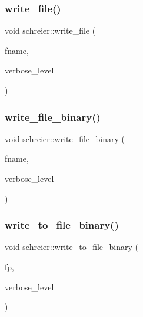 \mbox{\label{classschreier_a4b094c9217263aae3d58dc090f9e7867}} 
\subsubsection{\texorpdfstring{write\+\_\+file()}{write\_file()}}
{\footnotesize\ttfamily void schreier\+::write\+\_\+file (\begin{DoxyParamCaption}\item[{\mbox{\hyperlink{galois_8h_ab6cc7b4aeb6ea31aba2b3fbfc83ff5e6}{B\+Y\+TE}} $\ast$}]{fname,  }\item[{\mbox{\hyperlink{galois_8h_a09fddde158a3a20bd2dcadb609de11dc}{I\+NT}}}]{verbose\+\_\+level }\end{DoxyParamCaption})}

\mbox{\label{classschreier_ab72cab9ab2322675d1a1ad601b556332}} 
\subsubsection{\texorpdfstring{write\+\_\+file\+\_\+binary()}{write\_file\_binary()}}
{\footnotesize\ttfamily void schreier\+::write\+\_\+file\+\_\+binary (\begin{DoxyParamCaption}\item[{\mbox{\hyperlink{galois_8h_ab6cc7b4aeb6ea31aba2b3fbfc83ff5e6}{B\+Y\+TE}} $\ast$}]{fname,  }\item[{\mbox{\hyperlink{galois_8h_a09fddde158a3a20bd2dcadb609de11dc}{I\+NT}}}]{verbose\+\_\+level }\end{DoxyParamCaption})}

\mbox{\label{classschreier_af78e9fd5b26e8840b1cf5ba70c44cbbd}} 
\subsubsection{\texorpdfstring{write\+\_\+to\+\_\+file\+\_\+binary()}{write\_to\_file\_binary()}}
{\footnotesize\ttfamily void schreier\+::write\+\_\+to\+\_\+file\+\_\+binary (\begin{DoxyParamCaption}\item[{ofstream \&}]{fp,  }\item[{\mbox{\hyperlink{galois_8h_a09fddde158a3a20bd2dcadb609de11dc}{I\+NT}}}]{verbose\+\_\+level }\end{DoxyParamCaption})}

